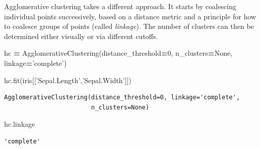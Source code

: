 \documentclass[
  letterpaper,
]{scrbook}
\newenvironment{Shaded}{\begin{snugshade}}{\end{snugshade}}
\newcommand{\DecValTok}[1]{\textcolor[rgb]{0.00,0.00,0.81}{#1}}
\newcommand{\NormalTok}[1]{#1}
\newcommand{\OperatorTok}[1]{\textcolor[rgb]{0.81,0.36,0.00}{\textbf{#1}}}
\newcommand{\StringTok}[1]{\textcolor[rgb]{0.31,0.60,0.02}{#1}}
\newcommand{\VariableTok}[1]{\textcolor[rgb]{0.00,0.00,0.00}{#1}}
\begin{document}
Agglomerative clustering takes a different approach. It starts by coalescing individual points successively, based on a distance metric and a principle for how to coalesce groups of points (called \emph{linkage}). The number of clusters can then be determined either visually or via different cutoffs.

\begin{Shaded}
\begin{Highlighting}[]
\NormalTok{hc }\OperatorTok{=}\NormalTok{ AgglomerativeClustering(distance_threshold}\OperatorTok{=}\DecValTok{0}\NormalTok{, n_clusters}\OperatorTok{=}\VariableTok{None}\NormalTok{, }
\NormalTok{                             linkage}\OperatorTok{=}\StringTok{'complete'}\NormalTok{)}

\NormalTok{hc.fit(iris[[}\StringTok{'Sepal.Length'}\NormalTok{,}\StringTok{'Sepal.Width'}\NormalTok{]])}
\end{Highlighting}
\end{Shaded}

\begin{verbatim}
AgglomerativeClustering(distance_threshold=0, linkage='complete',
                        n_clusters=None)
\end{verbatim}

\begin{Shaded}
\begin{Highlighting}[]
\NormalTok{hc.linkage}
\end{Highlighting}
\end{Shaded}

\begin{verbatim}
'complete'
\end{verbatim}
\end{document}
